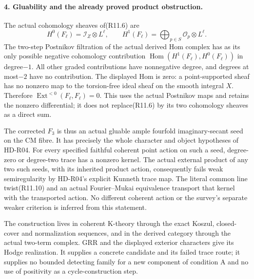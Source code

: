 \paragraph{4. Gluability and the already proved product obstruction.}
The actual cohomology sheaves of(R11.6) are
\[
 H^0(F_\ell)=\mathcal I_Z\otimes L^\ell,
 \qquad H^1(F_\ell)=\bigoplus_{p\in S}\mathcal O_p\otimes L^\ell.
                                                               \tag{R11.11}
\]
The two-step Postnikov filtration of the actual derived Hom
complex has as its only possible negative cohomology contribution
$\operatorname{Hom}(H^1(F_\ell),H^0(F_\ell))$ in degree$-1$.
All other graded contributions have nonnegative degree, and
degrees at most$-2$ have no contribution. The displayed Hom
is zero: a point-supported sheaf has no nonzero map to the
torsion-free ideal sheaf on the smooth integral $X$.
Therefore $\operatorname{Ext}^{<0}(F_\ell,F_\ell)=0$.
This uses the actual Postnikov maps and retains the nonzero
differential; it does not replace(R11.6) by its two cohomology
sheaves as a direct sum.

The corrected $F_3$ is thus an actual gluable ample fourfold
imaginary-secant seed on the CM fibre. It has precisely
the whole character and object hypotheses of HD-R04.
For every specified faithful coherent point action on such a
seed, degree-zero or degree-two trace has a nonzero kernel.
The actual external product of any two such seeds, with its
inherited product action, consequently fails weak semiregularity
by HD-R04's explicit Kunneth trace map. The literal common line
twist(R11.10) and an actual Fourier--Mukai equivalence transport
that kernel with the transported action. No different coherent
action or the survey's separate weaker criterion is inferred
from this statement.

The construction lives in coherent K-theory through the exact
Koszul, closed-cover and normalization sequences, and in the
derived category through the actual two-term complex. GRR and
the displayed exterior characters give its Hodge realization.
It supplies a concrete candidate and its failed trace route;
it supplies no bounded detecting family for a new component of
condition A and no use of positivity as a cycle-construction step.
